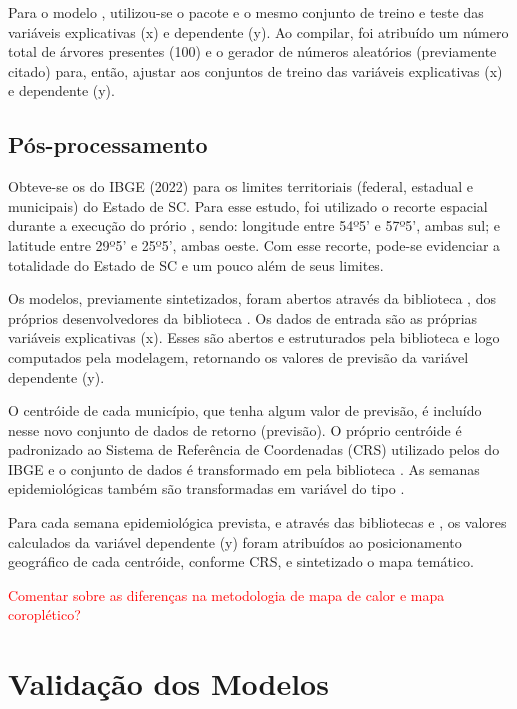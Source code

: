 \indent Para o modelo , utilizou-se o pacote  e o mesmo conjunto de treino e teste das variáveis explicativas (x) e dependente (y). Ao compilar, foi atribuído um número total de árvores presentes (100) e o gerador de números aleatórios (previamente citado) para, então, ajustar aos conjuntos de treino das variáveis explicativas (x) e dependente (y).

\subsection{Pós-processamento}

\indent Obteve-se os  do \acrshort{IBGE} (2022) para os limites territoriais (federal, estadual e municipais) do Estado de \acrlong{SC}. Para esse estudo, foi utilizado o recorte espacial durante a execução do prório , sendo: longitude entre 54º5' e 57º5', ambas sul; e latitude entre 29º5' e 25º5', ambas oeste. Com esse recorte, pode-se evidenciar a totalidade do Estado de \acrlong{SC} e um pouco além de seus limites.

\indent Os modelos, previamente sintetizados, foram abertos através da biblioteca , dos próprios desenvolvedores da biblioteca . Os dados de entrada são as próprias variáveis explicativas (x). Esses são abertos e estruturados pela biblioteca  e logo computados pela modelagem, retornando os valores de previsão da variável dependente (y).

\indent O centróide de cada município, que tenha algum valor de previsão, é incluído nesse novo conjunto de dados de retorno (previsão). O próprio centróide é padronizado ao Sistema de Referência de Coordenadas (\acrfull{CRS}) utilizado pelos  do \acrshort{IBGE} e o conjunto  de dados é transformado em  pela biblioteca . As semanas epidemiológicas também são transformadas em variável do tipo .

\indent Para cada semana epidemiológica prevista, e através das bibliotecas  e , os valores calculados da variável dependente (y) foram atribuídos ao posicionamento geográfico de cada centróide, conforme \acrshort{CRS}, e sintetizado o mapa temático.

\textcolor{red}{Comentar sobre as diferenças na metodologia de mapa de calor e mapa coroplético?}

\section{Validação dos Modelos}



